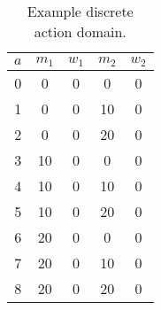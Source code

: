 
\begin{table}
\caption{Example discrete action domain.}
\label{tbl:example_actions}
\begin{center}
\begin{tabular}{c|c|c|c|c}
\hline
$a$ &$m_1$ &$w_1$ &$m_2$ &$w_2$ \\
\hline
 0 &0 &0 &0 &0 \\
 1 &0 &0 &10 &0 \\
 2 &0 &0 &20 &0 \\
 3 &10 &0 &0 &0 \\
 4 &10 &0 &10 &0 \\
 5 &10 &0 &20 &0 \\
 6 &20 &0 &0 &0 \\
 7 &20 &0 &10 &0 \\
 8 &20 &0 &20 &0 \\
\hline
\end{tabular}
\end{center}
\end{table}

